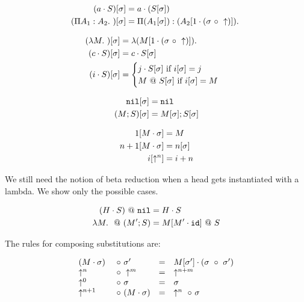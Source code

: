 \documentclass[11pt,twoside]{article}
\begin{document}

\begin{align*} 
(a\cdot S)[\sigma] &= a\cdot (S[\sigma]) \\
(\Pi A_1 : A_2.\ )[\sigma] &= \Pi (A_1[\sigma]) : (A_2[1\cdot(\sigma~\circ~\uparrow)]).\ \\
\end{align*} 


\begin{align*} 
(\lambda M.\ )[\sigma] &= \lambda (M[1\cdot(\sigma~\circ~\uparrow)]).\ \\
(c\cdot S)[\sigma] &= c\cdot S[\sigma] \\
(i\cdot S)[\sigma] &= \begin{cases}
                     j\cdot S[\sigma] \mbox{\ if $i[\sigma] = j$} \\
                     M ~@~ S[\sigma]\mbox{\ if $i[\sigma] = M$}
                   \end{cases} 
\end{align*} 


\begin{align*} 
\mathtt{nil}[\sigma] &= \mathtt{nil}\\
(M;S)[\sigma] &= M[\sigma];S[\sigma]
\end{align*} 


\begin{align*} 
1[M\cdot\sigma] &= M\\
n+1[M\cdot\sigma] &= n[\sigma]\\
i[\uparrow^n] &= i+n\\
\end{align*} 

We still need the notion of beta reduction when a 
head gets instantiated with a lambda.  We show
only the possible cases.

\bigskip 
{}

\begin{align*} 
(H\cdot S)~@~\mathtt{nil} &= H\cdot S\\
\lambda M.\ ~@~(M';S) &= M[M'\cdot\mathtt{id}]~@~ S
\end{align*} 

The rules for composing substitutions are:

\bigskip 
{}

$$
\begin{array}{llll}
(M\cdot \sigma) & ~\circ~ \sigma' &= &M[\sigma']\cdot (\sigma~\circ~\sigma') \\
\uparrow^n & ~\circ~ \uparrow^m &= &\uparrow^{n+m}\\
\uparrow^0 & ~\circ~ \sigma &= &\sigma\\
\uparrow^{n+1}&~\circ~ (M\cdot\sigma) &= &\uparrow^n~\circ~\sigma
\end{array} 
$$
\end{document}
